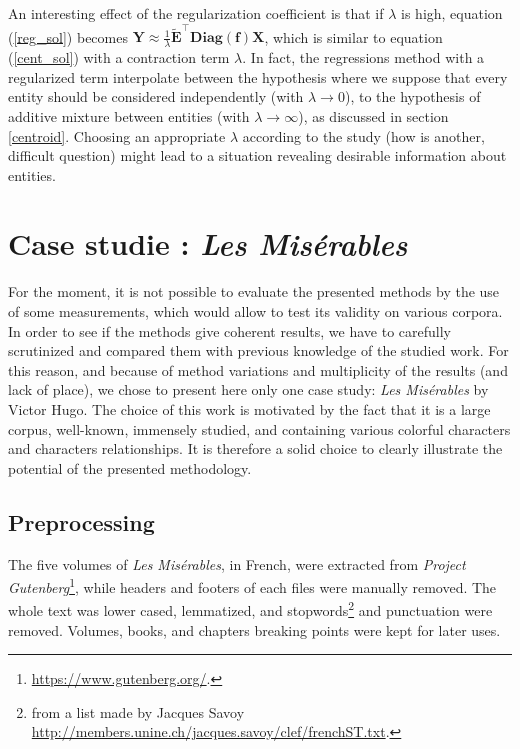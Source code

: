 \documentclass[
twocolumn,
]{ceurart}
\begin{document}
An interesting effect of the regularization coefficient is that if $\lambda$ is high, equation (\ref{reg_sol}) becomes $\mathbf{Y} \approx \frac{1}{\lambda} \widetilde{\mathbf{E}}^\top \textbf{Diag}(\mathbf{f}) \mathbf{X}$, which is similar to equation (\ref{cent_sol}) with a contraction term $\lambda$. In fact, the regressions method with a regularized term interpolate between the hypothesis where we suppose that every entity should be considered independently (with $\lambda \to 0$), to the hypothesis of additive mixture between entities (with $\lambda \to \infty$), as discussed in section \ref{centroid}. Choosing an appropriate $\lambda$ according to the study (how is another, difficult question) might lead to a situation revealing desirable information about entities.

\section{Case studie : \emph{Les Misérables}}
\label{case_studie}

For the moment, it is not possible to evaluate the presented methods by the use of some measurements, which would allow to test its validity on various corpora. In order to see if the methods give coherent results, we have to carefully scrutinized and compared them with previous knowledge of the studied work. For this reason, and because of method variations and multiplicity of the results (and lack of place), we chose to present here only one case study: \emph{Les Misérables} by Victor Hugo. The choice of this work is motivated by the fact that it is a large corpus, well-known, immensely studied, and containing various colorful characters and characters relationships. It is therefore a solid choice to clearly illustrate the potential of the presented methodology.

\subsection{Preprocessing}

The five volumes of \emph{Les Misérables}, in French, were extracted from \emph{Project Gutenberg}\footnote{\url{https://www.gutenberg.org/}.}, while headers and footers of each files were manually removed. The whole text was lower cased, lemmatized, and stopwords\footnote{from a list made by Jacques Savoy \url{http://members.unine.ch/jacques.savoy/clef/frenchST.txt}.} and punctuation were removed. Volumes, books, and chapters breaking points were kept for later uses. 
\end{document}
